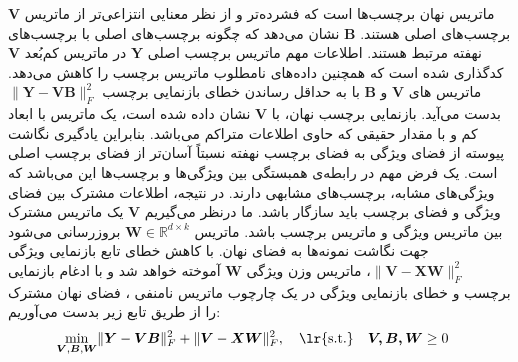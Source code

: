 $\bm{V}$
ماتریس نهان برچسب‌ها است که فشرده‌تر و از نظر معنایی انتزاعی‌تر از ماتریس برچسب‌های اصلی هستند.
$\bm{B}$
نشان می‌دهد که چگونه برچسب‌های اصلی با برچسب‌های نهفته مرتبط هستند. اطلاعات مهم ماتریس برچسب اصلی $\bm{Y}$ در ماتریس کم‌بُعد $\bm{V}$ کدگذاری شده است که همچنین داده‌های نامطلوب ماتریس برچسب را کاهش می‌دهد. ماتریس های $\bm{V}$ و $\bm{B}$ با به حداقل رساندن خطای بازنمایی برچسب $\lVert\bm{Y} - \bm{VB}\rVert^2_F$ بدست می‌آید. بازنمایی برچسب نهان، با $\bm{V}$ نشان داده شده است، یک ماتریس با ابعاد کم و با مقدار حقیقی که حاوی اطلاعات متراکم می‌باشد. بنابراین یادگیری نگاشت پیوسته از فضای ویژگی به فضای برچسب نهفته نسبتاً آسان‌تر از فضای برچسب اصلی است\cite{zhu2017multi}.
یک فرض مهم در رابطه‌ی همبستگی بین ویژگی‌ها و برچسب‌ها این می‌باشد که ویژگی‌های مشابه، برچسب‌های مشابهی دارند. در نتیجه، اطلاعات مشترک بین فضای ویژگی و فضای برچسب باید سازگار باشد. ما درنظر می‌گیریم $\bm{V}$ یک ماتریس مشترک بین ماتریس ویژگی و ماتریس برچسب باشد. ماتریس $\bm{W} \in \mathbb{R}^{d \times k}$ بروزرسانی می‌شود جهت نگاشت نمونه‌ها به فضای نهان. با کاهش خطای تابع بازنمایی ویژگی $\lVert\bm{V} - \bm{XW}\rVert^2_F$، ماتریس وزن ویژگی $\bm{W}$ آموخته خواهد شد و با ادغام بازنمایی برچسب و خطای بازنمایی ویژگی در یک چارچوب ماتریس نامنفی \cite{lee1999learning}، فضای نهان مشترک را از طریق تابع زیر بدست می‌آوریم:
\begin{align}
	\min_{\bm{V},\bm{B},\bm{W}}&\lVert\bm{Y}-\bm{V}\bm{B}\rVert^2_F+\lVert\bm{V}-\bm{X}\bm{W}\rVert^2_F,\quad{\text{\lr{s.t.}}\quad}\bm{{V,B,W}}\geq 0
\end{align}
